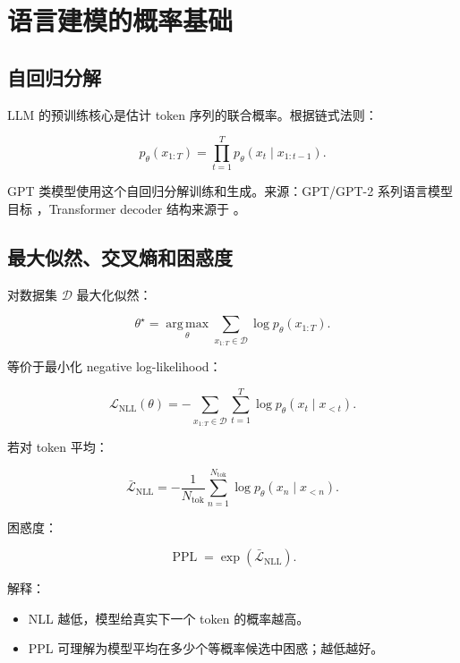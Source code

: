 \documentclass[UTF8,12pt]{ctexart}
\newcommand{\1}{\mathbf{1}}
\newcommand{\argmax}{\operatorname*{arg\,max}}
\newcommand{\PPL}{\operatorname{PPL}}
\begin{document}
\section{语言建模的概率基础}

\subsection{自回归分解}

LLM 的预训练核心是估计 token 序列的联合概率。根据链式法则：

\begin{equation}
p_\theta(x_{1:T})
=\prod_{t=1}^{T}p_\theta(x_t\mid x_{1:t-1}).
\label{eq:ar-factorization}
\end{equation}

GPT 类模型使用这个自回归分解训练和生成。来源：GPT/GPT-2 系列语言模型目标 \cite{radford2019gpt2,brown2020gpt3}，Transformer decoder 结构来源于 \cite{vaswani2017attention}。

\subsection{最大似然、交叉熵和困惑度}

对数据集 $\mathcal{D}$ 最大化似然：

\begin{equation}
\theta^\star
=\argmax_\theta
\sum_{x_{1:T}\in\mathcal{D}}\log p_\theta(x_{1:T}).
\end{equation}

等价于最小化 negative log-likelihood：

\begin{equation}
\mathcal{L}_{\mathrm{NLL}}(\theta)
=-\sum_{x_{1:T}\in\mathcal{D}}\sum_{t=1}^{T}
\log p_\theta(x_t\mid x_{<t}).
\label{eq:nll}
\end{equation}

若对 token 平均：

\begin{equation}
\bar{\mathcal{L}}_{\mathrm{NLL}}
=-\frac{1}{N_{\mathrm{tok}}}
\sum_{n=1}^{N_{\mathrm{tok}}}
\log p_\theta(x_n\mid x_{<n}).
\end{equation}

困惑度：

\begin{equation}
\PPL=\exp\left(\bar{\mathcal{L}}_{\mathrm{NLL}}\right).
\end{equation}

解释：

\begin{itemize}
  \item NLL 越低，模型给真实下一个 token 的概率越高。
  \item PPL 可理解为模型平均在多少个等概率候选中困惑；越低越好。
\end{itemize}
\end{document}
